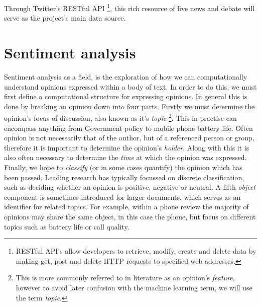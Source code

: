 Through Twitter's RESTful API \footnote{RESTful API's allow developers to retrieve, modify, create and delete data by making get, post and delete HTTP requests to specified web addresses.}, this rich resource of live news and debate will serve as the project's main data source.

\section{Sentiment analysis}
\label{background:sentiment_analysis}

Sentiment analysis as a field, is the exploration of how we can computationally understand opinions expressed within a body of text. In order to do this, we must first define a computational structure for expressing opinions. In general \cite{Liu:2010tm} this is done by breaking an opinion down into four parts. Firstly we must determine the opinion's focus of discussion, also known as it's \emph{topic} \footnote{This is more commonly referred to in literature as an opinion's \emph{feature}, however to avoid later confusion with the machine learning term, we will use the term \emph{topic}.}. This in practise can encompass anything from Government policy to mobile phone battery life. Often opinion is not necessarily that of the author, but of a referenced person or group, therefore it is important to determine the opinion's \emph{holder}. Along with this it is also often necessary to determine the \emph{time} at which the opinion was expressed. Finally, we hope to \emph{classify} (or in some cases quantify) the opinion which has been passed. Leading research \cite{Pang:2002tu,Turney:2002vv} has typically focussed on discrete classification, such as deciding whether an opinion is positive, negative or neutral. A fifth \emph{object} component is sometimes introduced for larger documents, which serves as an identifier for related topics. For example, within a phone review the majority of opinions may share the same object, in this case the phone, but focus on different topics such as battery life or call quality. 

